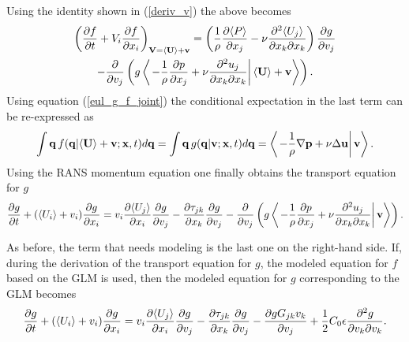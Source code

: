 \documentclass[oneside,a4paper,11pt]{report}
\begin{document}
Using the identity shown in (\ref{deriv_v}) the above becomes
\begin{multline}
\left ( \frac{\partial f}{\partial t} + V_i \frac{\partial f}{\partial x_i} \right )_{\mathbf{V} = \langle \mathbf{U} \rangle + \mathbf{v}} = \left ( \frac{1}{\rho} \frac{\partial \langle P \rangle}{\partial x_j} -\nu \frac{\partial^2 \langle U_j \rangle}{\partial x_k \partial x_k} \right) \frac{\partial g}{\partial v_j} \\
- \frac{\partial}{\partial v_j} \left ( g \left < \left . - \frac{1}{\rho} \frac{\partial p}{\partial x_j} +  \nu \frac{\partial ^2 u_j}{\partial x_k \partial x_k} \right | \langle \mathbf{U} \rangle + \mathbf{v} \right > \right ). \end{multline}
Using equation (\ref{eul_g_f_joint}) the conditional expectation in the last term can be re-expressed as
\begin{equation}
\int \mathbf{q}\, f(\mathbf{q} | \langle \mathbf{U} \rangle + \mathbf{v}; \mathbf{x}, t) d\mathbf{q} = \int \mathbf{q}\, g(\mathbf{q} | \mathbf{v}; \mathbf{x}, t) d\mathbf{q} = \left < \left . - \frac{1}{\rho} \nabla \mathbf{p} +  \nu \Delta \mathbf{u} \right | \mathbf{v} \right >.
\end{equation}
Using the RANS momentum equation one finally obtains the transport equation for $g$
\begin{equation}
\frac{\partial g}{\partial t} + ( \langle U_i \rangle + v_i ) \frac{\partial g}{\partial x_i} = v_i \frac{\partial \langle U_j \rangle}{\partial x_i} \frac{\partial g}{\partial v_j} - \frac{\partial \tau_{jk}}{\partial x_k} \frac{\partial g}{\partial v_j} - \frac{\partial}{\partial v_j} \left ( g \left < \left . - \frac{1}{\rho} \frac{\partial p}{\partial x_j} +  \nu \frac{\partial ^2 u_j}{\partial x_k \partial x_k} \right | \mathbf{v} \right > \right ).
\end{equation}

As before, the term that needs modeling is the last one on the right-hand side. If, during the derivation of the transport equation for $g$, the modeled equation for $f$ based on the GLM is used, then the modeled equation for $g$ corresponding to the GLM becomes
\begin{equation}
\frac{\partial g}{\partial t} + ( \langle U_i \rangle + v_i ) \frac{\partial g}{\partial x_i} = v_i \frac{\partial \langle U_j \rangle}{\partial x_i} \frac{\partial g}{\partial v_j} - \frac{\partial \tau_{jk}}{\partial x_k} \frac{\partial g}{\partial v_j} - \frac{\partial g G_{jk} v_k}{\partial v_j}  + \frac{1}{2} C_0 \epsilon \frac{\partial^2 g}{\partial v_k \partial v_k}.
\end{equation}
\end{document}
